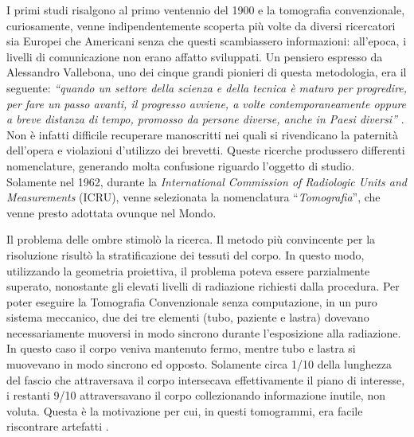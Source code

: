 \documentclass[a4paper,12pt, doubleside]{report}
\begin{document}
                \bigskip            
                \par
                    I primi studi risalgono al primo ventennio del 1900 e la tomografia convenzionale, curiosamente, venne indipendentemente scoperta più volte da diversi ricercatori sia Europei che Americani senza che questi scambiassero informazioni: all'epoca, i livelli di comunicazione non erano affatto sviluppati. Un pensiero espresso da Alessandro Vallebona, uno dei cinque grandi pionieri di questa metodologia, era il seguente: \textit{“quando un settore della scienza e della tecnica è maturo per progredire, per fare un passo avanti, il progresso avviene, a volte contemporaneamente oppure a breve distanza di tempo, promosso da persone diverse, anche in Paesi diversi”} \cite{vallebona-pensiero}.
                    Non è infatti difficile recuperare manoscritti nei quali si rivendicano la paternità dell'opera e violazioni d'utilizzo dei brevetti\cite{vallebona-difesa}. Queste ricerche produssero differenti nomenclature, generando molta confusione riguardo l'oggetto di studio. Solamente nel 1962, durante la \textit{International Commission of Radiologic Units and Measurements} (ICRU), venne selezionata la nomenclatura “\textit{Tomografia}”, che venne presto adottata ovunque nel Mondo.
                            
                \bigskip
                \par
                    Il problema delle ombre stimolò la ricerca. Il metodo più convincente per la risoluzione risultò la stratificazione dei tessuti del corpo. In questo modo, utilizzando la geometria proiettiva, il problema poteva essere parzialmente superato, nonostante gli elevati livelli di radiazione richiesti dalla procedura. Per poter eseguire la Tomografia Convenzionale senza computazione, in un puro sistema meccanico, due dei tre elementi (tubo, paziente e lastra) dovevano necessariamente muoversi in modo sincrono durante l’esposizione alla radiazione.  In questo caso il corpo veniva mantenuto fermo, mentre tubo e lastra si muovevano in modo sincrono ed opposto. Solamente circa 1/10 della lunghezza del fascio che attraversava il corpo intersecava effettivamente il piano di interesse, i restanti 9/10 attraversavano il corpo collezionando informazione inutile, non voluta. Questa è la motivazione per cui, in questi tomogrammi, era facile riscontrare artefatti \cite{hounsfield-nobel-lecture}.
                
\end{document}
